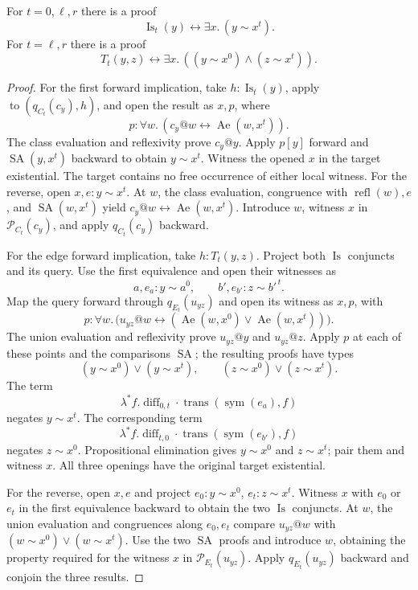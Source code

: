 \begin{lemma}
\label{rel-witnesses}
For \(t=0,\ell,r\) there is a proof
\[
 \operatorname{Is}_t(y)\leftrightarrow
                         \exists x.\,(y\sim x^t).
\]
For \(t=\ell,r\) there is a proof
\[
 T_t(y,z)\leftrightarrow
             \exists x.\,((y\sim x^0)\land(z\sim x^t)).
\]
\end{lemma}
\begin{proof}
For the first forward implication, take
\(h:\operatorname{Is}_t(y)\), apply
\(\operatorname{to}(q_{C_t}(c_y),h)\), and open the result
as \(x,p\), where
\[
 p:\forall w.\,(c_y@w\leftrightarrow\operatorname{Ae}(w,x^t)).
\]
The class evaluation and reflexivity prove \(c_y@y\).
Apply \(p[y]\) forward and \(\operatorname{SA}(y,x^t)\)
backward to obtain \(y\sim x^t\).  Witness the opened \(x\)
in the target existential.  The target contains no free
occurrence of either local witness.
For the reverse, open \(x,e:y\sim x^t\).
At \(w\), the class evaluation, congruence with
\(\operatorname{refl}(w),e\), and
\(\operatorname{SA}(w,x^t)\) yield
\(c_y@w\leftrightarrow\operatorname{Ae}(w,x^t)\).
Introduce \(w\), witness \(x\) in \(\mathcal P_{C_t}(c_y)\),
and apply \(q_{C_t}(c_y)\) backward.

For the edge forward implication, take \(h:T_t(y,z)\).
Project both \(\operatorname{Is}\) conjuncts and its query.
Use the first equivalence and open their witnesses as
\[
 a,e_a:y\sim a^0,\qquad
 b',e_{b'}:z\sim b'^{\,t}.
\]
Map the query forward through \(q_{E_t}(u_{yz})\) and
open its witness as \(x,p\), with
\[
 p:\forall w.\,
   \bigl(u_{yz}@w\leftrightarrow
    (\operatorname{Ae}(w,x^0)\lor\operatorname{Ae}(w,x^t))\bigr).
\]
The union evaluation and reflexivity prove \(u_{yz}@y\)
and \(u_{yz}@z\).  Apply \(p\) at each of these points and
the comparisons \(\operatorname{SA}\); the resulting proofs
have types
\[
 (y\sim x^0)\lor(y\sim x^t),\qquad
 (z\sim x^0)\lor(z\sim x^t).
\]
The term
\[
 \lambda^*f.\operatorname{diff}_{0,t}\cdot
        \operatorname{trans}(\operatorname{sym}(e_a),f)
\]
negates \(y\sim x^t\).  The corresponding term
\[
 \lambda^*f.\operatorname{diff}_{t,0}\cdot
        \operatorname{trans}(\operatorname{sym}(e_{b'}),f)
\]
negates \(z\sim x^0\).  Propositional elimination gives
\(y\sim x^0\) and \(z\sim x^t\); pair them and witness \(x\).
All three openings have the original target existential.

For the reverse, open \(x,e\) and project
\(e_0:y\sim x^0\), \(e_t:z\sim x^t\).
Witness \(x\) with \(e_0\) or \(e_t\) in the first
equivalence backward to obtain the two \(\operatorname{Is}\)
conjuncts.  At \(w\), the union evaluation and congruences
along \(e_0,e_t\) compare \(u_{yz}@w\) with
\((w\sim x^0)\lor(w\sim x^t)\).  Use the two
\(\operatorname{SA}\) proofs and introduce \(w\), obtaining
the property required for the witness \(x\) in
\(\mathcal P_{E_t}(u_{yz})\).  Apply \(q_{E_t}(u_{yz})\)
backward and conjoin the three results.
\end{proof}

